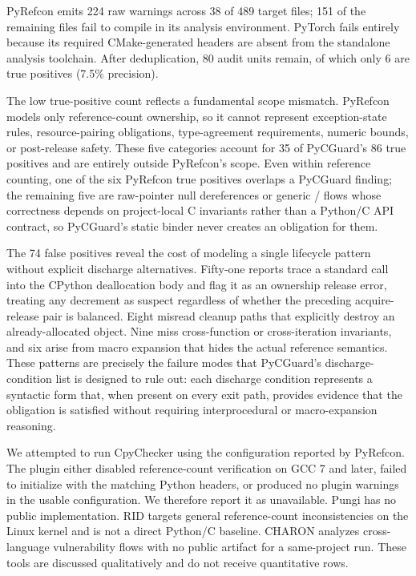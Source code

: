 PyRefcon emits 224 raw warnings across 38 of 489 target files; 151 of
the remaining files fail to compile in its analysis environment.
PyTorch fails entirely because its required CMake-generated headers
are absent from the standalone analysis toolchain.
After deduplication, 80 audit units remain, of which only 6 are true
positives (7.5\% precision).

The low true-positive count reflects a fundamental scope mismatch.
PyRefcon models only reference-count ownership, so it cannot represent
exception-state rules, resource-pairing obligations, type-agreement
requirements, numeric bounds, or post-release safety. These five categories
account for 35 of PyCGuard's 86 true positives and are entirely outside
PyRefcon's scope. Even within
reference counting, one of the six PyRefcon true positives overlaps a
PyCGuard finding; the remaining five are raw-pointer null dereferences
or generic / flows whose correctness depends on
project-local C invariants rather than a Python/C API contract, so
PyCGuard's static binder never creates an obligation for them.

The 74 false positives reveal the cost of modeling a single lifecycle
pattern without explicit discharge alternatives. Fifty-one reports trace
a standard  call into the CPython deallocation body
and flag it as an ownership release error, treating any decrement as
suspect regardless of whether the preceding acquire-release pair is
balanced. Eight misread cleanup paths that explicitly destroy an
already-allocated object. Nine miss cross-function or cross-iteration
invariants, and six arise from macro expansion that hides the actual
reference semantics. These patterns are precisely the failure modes
that PyCGuard's discharge-condition list is designed to rule out: each
discharge condition represents a syntactic form that, when present on
every exit path, provides evidence that the obligation is satisfied without requiring
interprocedural or macro-expansion reasoning.

We attempted to run CpyChecker using the configuration reported by
PyRefcon. The plugin either disabled reference-count verification on
GCC 7 and later, failed to initialize with the matching Python headers,
or produced no plugin warnings in the usable configuration. We
therefore report it as unavailable. Pungi has no public implementation.
RID targets general reference-count inconsistencies on the Linux kernel
\cite{rid2016} and is not a direct Python/C baseline. CHARON analyzes
cross-language vulnerability flows \cite{charon2025} with no public
artifact for a same-project run. These tools are discussed qualitatively
and do not receive quantitative rows.

